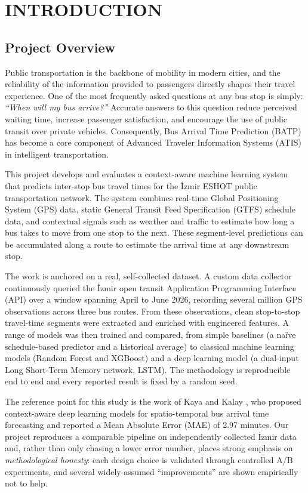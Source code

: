 \chapter{INTRODUCTION}

\section{Project Overview}

Public transportation is the backbone of mobility in modern cities, and the reliability of the information provided to passengers directly shapes their travel experience. One of the most frequently asked questions at any bus stop is simply: \textit{``When will my bus arrive?''} Accurate answers to this question reduce perceived waiting time, increase passenger satisfaction, and encourage the use of public transit over private vehicles. Consequently, Bus Arrival Time Prediction (BATP) has become a core component of Advanced Traveler Information Systems (ATIS) in intelligent transportation.

This project develops and evaluates a context-aware machine learning system that predicts inter-stop bus travel times for the İzmir ESHOT public transportation network. The system combines real-time Global Positioning System (GPS) data, static General Transit Feed Specification (GTFS) schedule data, and contextual signals such as weather and traffic to estimate how long a bus takes to move from one stop to the next. These segment-level predictions can be accumulated along a route to estimate the arrival time at any downstream stop.

The work is anchored on a real, self-collected dataset. A custom data collector continuously queried the İzmir open transit Application Programming Interface (API) over a window spanning April to June 2026, recording several million GPS observations across three bus routes. From these observations, clean stop-to-stop travel-time segments were extracted and enriched with engineered features. A range of models was then trained and compared, from simple baselines (a naïve schedule-based predictor and a historical average) to classical machine learning models (Random Forest and XGBoost) and a deep learning model (a dual-input Long Short-Term Memory network, LSTM). The methodology is reproducible end to end and every reported result is fixed by a random seed.

The reference point for this study is the work of Kaya and Kalay \cite{kaya2025}, who proposed context-aware deep learning models for spatio-temporal bus arrival time forecasting and reported a Mean Absolute Error (MAE) of 2.97 minutes. Our project reproduces a comparable pipeline on independently collected İzmir data and, rather than only chasing a lower error number, places strong emphasis on \textit{methodological honesty}: each design choice is validated through controlled A/B experiments, and several widely-assumed ``improvements'' are shown empirically not to help.

